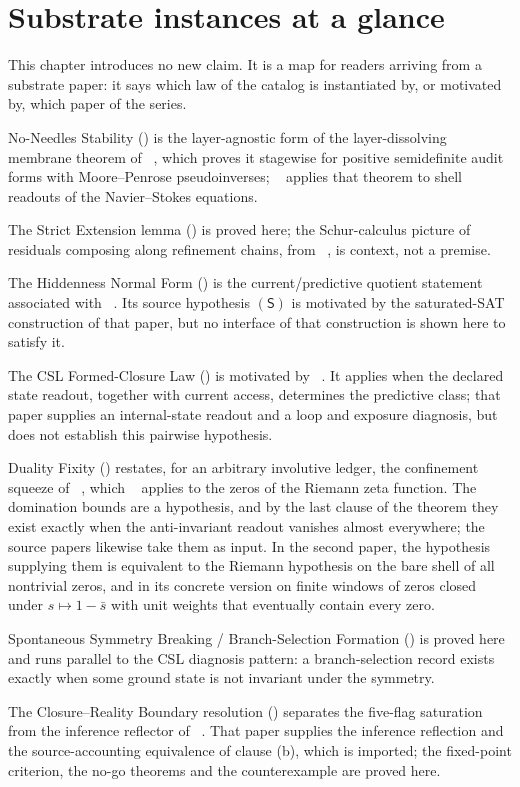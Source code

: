 \section{Substrate instances at a glance}\label{sec:substrate-instances}

This chapter introduces no new claim.  It is a map for readers arriving
from a substrate paper: it says which law of the catalog is
instantiated by, or motivated by, which paper of the series.

No-Needles Stability () is the layer-agnostic form of the
layer-dissolving membrane theorem of \PaperNeedleKiller\
\citep{Tsiokos2026NeedleKiller}, which proves it stagewise for positive
semidefinite audit forms with Moore--Penrose pseudoinverses;
\PaperNS\ \citep{Tsiokos2026NavierStokes} applies that theorem to shell
readouts of the Navier--Stokes equations.

The Strict Extension lemma () is proved here; the
Schur-calculus picture of residuals composing along refinement chains,
from \PaperAR\ \citep{Tsiokos2026XiCompanion}, is context, not a
premise.

The Hiddenness Normal Form () is the current/predictive
quotient statement associated with \PaperPvNP\
\citep{Tsiokos2026PvNP}.  Its source hypothesis \((\mathsf S)\) is
motivated by the saturated-SAT construction of that paper, but no
interface of that construction is shown here to satisfy it.

The CSL Formed-Closure Law () is motivated by \PaperCSL\
\citep{Tsiokos2026CSL}.  It applies when the declared state readout,
together with current access, determines the predictive class; that
paper supplies an internal-state readout and a loop and exposure
diagnosis, but does not establish this pairwise hypothesis.

Duality Fixity (\Cref{thm:F14}) restates, for an arbitrary involutive
ledger, the confinement squeeze of \PaperSDTC\ \citep{Tsiokos2026SDTC},
which \PaperRH\ \citep{Tsiokos2026RH} applies to the zeros of the
Riemann zeta function.  The domination bounds are a hypothesis, and by
the last clause of the theorem they exist exactly when the anti-invariant
readout vanishes almost everywhere; the source papers likewise take them
as input.  In the second paper, the hypothesis supplying them is
equivalent to the Riemann hypothesis on the bare shell of all
nontrivial zeros, and in its concrete version on finite windows of zeros
closed under \(s\mapsto1-\bar s\) with unit weights that eventually
contain every zero.

Spontaneous Symmetry Breaking / Branch-Selection Formation
(\Cref{thm:F15b}) is proved here and runs parallel to the CSL diagnosis
pattern: a branch-selection record exists exactly when some ground
state is not invariant under the symmetry.

The Closure--Reality Boundary resolution (\Cref{prop:F53}) separates
the five-flag saturation from the inference reflector of \PaperAOR\
\citep{Tsiokos2026AOR}.  That paper supplies the inference reflection
and the source-accounting equivalence of clause (b), which is imported;
the fixed-point criterion, the no-go theorems and the counterexample are
proved here.


